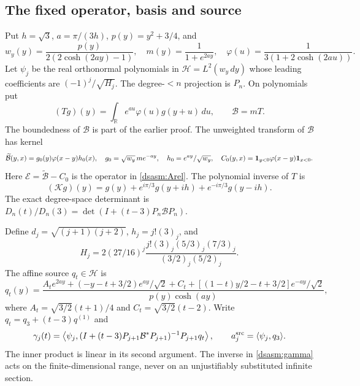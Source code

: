 \documentclass[11pt,letterpaper]{article}
\theoremstyle{remark}\newtheorem{remark}[theorem]{Remark}
\newcommand{\R}{\mathbb R}\newcommand{\C}{\mathbb C}\newcommand{\N}{\mathbb N}
\begin{document}
\subsection{The fixed operator, basis and source}
Put $h=\sqrt3$, $a=\pi/(3h)$, $p(y)=y^2+3/4$, and
\begin{equation}\label{dsasm:realdefinitions}
 w_y(y)=\frac{p(y)}{2(2\cosh(2ay)-1)},\quad
 m(y)=\frac1{1+e^{2ay}},\quad
 \varphi(u)=\frac1{3(1+2\cosh(2au))}.
\end{equation}
Let $\psi_j$ be the real orthonormal polynomials in
$\mathcal H=L^2(w_y\,dy)$ whose leading coefficients are
$(-1)^j/\sqrt{H_j}$. The degree-$<n$ projection is $P_n$.
On polynomials put
\[
 (Tg)(y)=\int_\R e^{au}\varphi(u)g(y+u)\,du,\qquad \mathcal B=mT.
\]
The boundedness of $\mathcal B$ is part of the earlier proof.
The unweighted transform of $\mathcal B$ has kernel
\begin{equation}\label{dsasm:kernelreal}
 \widetilde{\mathcal B}(y,x)=g_0(y)\varphi(x-y)h_0(x),\quad
 g_0=\sqrt{w_y}\,m e^{-ay},\quad h_0=e^{ay}/\sqrt{w_y},
 \quad C_0(y,x)=\mathbf1_{y<0}\varphi(x-y)\mathbf1_{x<0}.
\end{equation}
Here $\mathcal E=\widetilde{\mathcal B}-C_0$ is the operator in
\eqref{dsasm:Arel}. The polynomial inverse of $T$ is
\[
 (\mathcal Kg)(y)=g(y)+e^{i\pi/3}g(y+ih)+e^{-i\pi/3}g(y-ih).
\]
The exact degree-space determinant is
$D_n(t)/D_n(3)=\det(I+(t-3)P_n\mathcal B P_n)$.

Define $d_j=\sqrt{(j+1)(j+2)}$, $h_j=j!(3)_j$, and
\begin{equation}\label{dsasm:Hnorm}
 H_j=2(27/16)^j
       \frac{j!(3)_j(5/3)_j(7/3)_j}{(3/2)_j(5/2)_j}.
\end{equation}
The affine source $q_t\in\mathcal H$ is
\begin{equation}\label{dsasm:qsource}
 q_t(y)=\frac{A_t e^{2ay}+(-y-t+3/2)e^{ay}/\sqrt2+C_t
           +[(1-t)y/2-t+3/2]e^{-ay}/\sqrt2}{p(y)\cosh(ay)},
\end{equation}
where $A_t=\sqrt{3/2}(t+1)/4$ and $C_t=\sqrt{3/2}(t-2)$.
Write $q_t=q_3+(t-3)q^{(1)}$ and
\begin{equation}\label{dsasm:gamma}
 \gamma_j(t)=\left\langle\psi_j,
   (I+(t-3)P_{j+1}\mathcal B^*P_{j+1})^{-1}P_{j+1}q_t\right\rangle,
 \qquad a_j^{\rm src}=\langle\psi_j,q_3\rangle.
\end{equation}
The inner product is linear in its second argument. The inverse in
\eqref{dsasm:gamma} acts on the finite-dimensional range, never on an
unjustifiably substituted infinite section.
\end{document}
